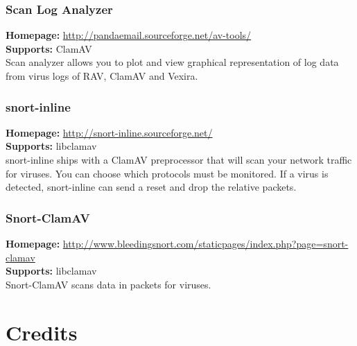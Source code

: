 \documentclass[a4paper,titlepage,12pt]{article}
\begin{document}
    \subsubsection{Scan Log Analyzer}
    \textbf{Homepage:} \url{http://pandaemail.sourceforge.net/av-tools/}\\
    \textbf{Supports:} ClamAV\\[4pt]
    Scan analyzer allows you to plot and view graphical representation of
    log data from virus logs of RAV, ClamAV and Vexira. 

    \subsubsection{snort-inline}
    \textbf{Homepage:} \url{http://snort-inline.sourceforge.net/}\\
    \textbf{Supports:} libclamav\\[4pt]
    snort-inline ships with a ClamAV preprocessor that will scan your network
    traffic for viruses. You can choose which protocols must be monitored. If
    a virus is detected, snort-inline can send a reset and drop the relative
    packets.

    \subsubsection{Snort-ClamAV}
    \textbf{Homepage:} \url{http://www.bleedingsnort.com/staticpages/index.php?page=snort-clamav}\\
    \textbf{Supports:} libclamav\\[4pt]
    Snort-ClamAV scans data in packets for viruses.

    \section{Credits}
\end{document}
